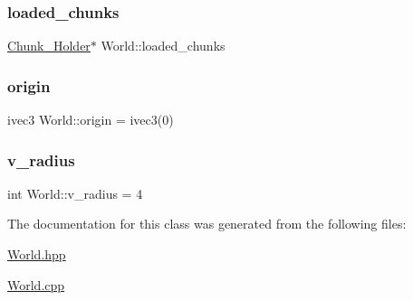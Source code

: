 \mbox{\label{classWorld_a712003d390612b1c123013db8dcabc75}} 
\subsubsection{\texorpdfstring{loaded\+\_\+chunks}{loaded\_chunks}}
{\footnotesize\ttfamily \mbox{\hyperlink{classChunk__Holder}{Chunk\+\_\+\+Holder}}$\ast$ World\+::loaded\+\_\+chunks\hspace{0.3cm}{\ttfamily [private]}}

\mbox{\label{classWorld_a832a85c0faf5e0e71a26265e1d893285}} 
\subsubsection{\texorpdfstring{origin}{origin}}
{\footnotesize\ttfamily ivec3 World\+::origin = ivec3(0)}

\mbox{\label{classWorld_a055ae0d6d9a2a5f0cc891cc77157a48a}} 
\subsubsection{\texorpdfstring{v\+\_\+radius}{v\_radius}}
{\footnotesize\ttfamily int World\+::v\+\_\+radius = 4}



The documentation for this class was generated from the following files\+:\begin{DoxyCompactItemize}
\item 
\mbox{\hyperlink{World_8hpp}{World.\+hpp}}\item 
\mbox{\hyperlink{World_8cpp}{World.\+cpp}}\end{DoxyCompactItemize}
